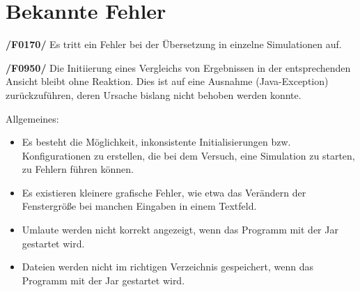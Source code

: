 \section{Bekannte Fehler}

\textbf{/F0170/}
Es tritt ein Fehler bei der Übersetzung in einzelne Simulationen auf.

\textbf{/F0950/}
Die Initiierung eines Vergleichs von Ergebnissen in der entsprechenden Ansicht bleibt ohne Reaktion. Dies ist auf eine Ausnahme (Java-Exception) zurückzuführen, deren Ursache bislang nicht behoben werden konnte.

Allgemeines:
\begin{itemize}
\item Es besteht die Möglichkeit, inkonsistente Initialisierungen bzw. Konfigurationen zu erstellen, die bei dem Versuch, eine Simulation zu starten, zu Fehlern führen können.

\item Es existieren kleinere grafische Fehler, wie etwa das Verändern der Fenstergröße bei manchen Eingaben in einem Textfeld.

\item Umlaute werden nicht korrekt angezeigt, wenn das Programm mit der Jar gestartet wird.

\item Dateien werden nicht im richtigen Verzeichnis gespeichert, wenn das Programm mit der Jar gestartet wird.
\end{itemize}